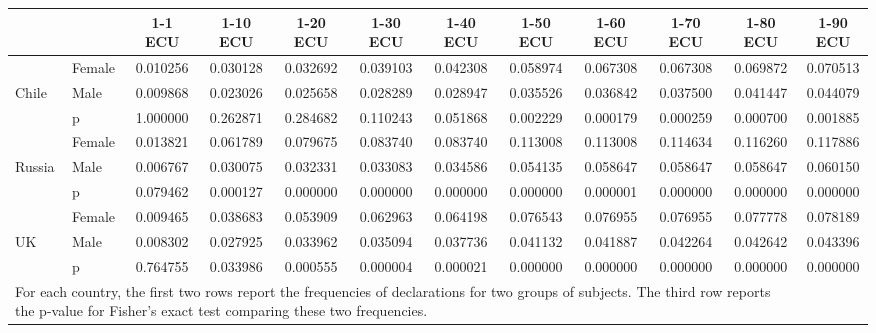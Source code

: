 \def\sym#1{\ifmmode^{#1}\else\(^{#1}\)\fi}
\begin{tabular}{|ll|cccccccccc|}
\hline\hline
&&1-1 ECU&1-10 ECU&1-20 ECU&1-30 ECU&1-40 ECU&1-50 ECU&1-60 ECU&1-70 ECU&1-80 ECU&1-90 ECU\\
\hline
&Female& 0.010256& 0.030128& 0.032692& 0.039103& 0.042308& 0.058974& 0.067308& 0.067308& 0.069872& 0.070513\\
Chile&Male& 0.009868& 0.023026& 0.025658& 0.028289& 0.028947& 0.035526& 0.036842& 0.037500& 0.041447& 0.044079\\
&p& 1.000000& 0.262871& 0.284682& 0.110243& 0.051868& 0.002229& 0.000179& 0.000259& 0.000700& 0.001885\\
\hline&Female& 0.013821& 0.061789& 0.079675& 0.083740& 0.083740& 0.113008& 0.113008& 0.114634& 0.116260& 0.117886\\
Russia&Male& 0.006767& 0.030075& 0.032331& 0.033083& 0.034586& 0.054135& 0.058647& 0.058647& 0.058647& 0.060150\\
&p& 0.079462& 0.000127& 0.000000& 0.000000& 0.000000& 0.000000& 0.000001& 0.000000& 0.000000& 0.000000\\
\hline&Female& 0.009465& 0.038683& 0.053909& 0.062963& 0.064198& 0.076543& 0.076955& 0.076955& 0.077778& 0.078189\\
UK&Male& 0.008302& 0.027925& 0.033962& 0.035094& 0.037736& 0.041132& 0.041887& 0.042264& 0.042642& 0.043396\\
&p& 0.764755& 0.033986& 0.000555& 0.000004& 0.000021& 0.000000& 0.000000& 0.000000& 0.000000& 0.000000\\
\hline\multicolumn{11}{p{15cm}}{\tiny For each country, the first two rows report the frequencies of declarations for two groups of subjects. The third row reports the p-value for Fisher's exact test comparing these two frequencies.}\\
\end{tabular}